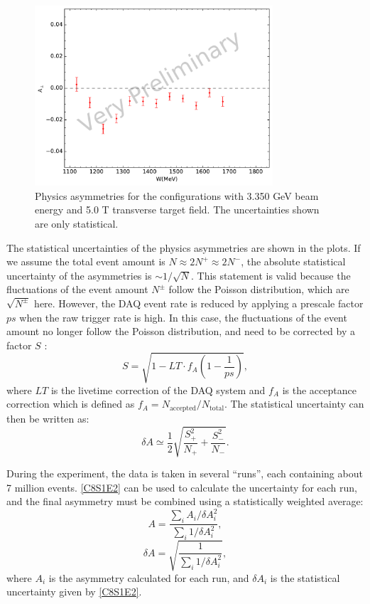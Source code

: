 \begin{figure}[tb!]
  \centering
  \includegraphics[width=0.79\textwidth]{figs/asymmetry-33505090.pdf}
  \caption[Physics asymmetries with $E=3.350$ GeV and $B=5.0$ T.]{Physics asymmetries for the configurations with 3.350 GeV beam energy and 5.0 T transverse target field. The uncertainties shown are only statistical. \label{C8S1F4}}
\end{figure}

The statistical uncertainties of the physics asymmetries are shown in the plots. If we assume the total event amount is $N\approx2N^+\approx2N^-$, the absolute statistical uncertainty of the asymmetries is $\sim1/\sqrt{N}$. This statement is valid because the fluctuations of the event amount $N^{\pm}$ follow the Poisson distribution, which are $\sqrt{N^{\pm}}$ here. However, the DAQ event rate is reduced by applying a prescale factor $ps$ when the raw trigger rate is high. In this case, the fluctuations of the event amount no longer follow the Poisson distribution, and need to be corrected by a factor $S$ \cite{Qiang2007}:
\begin{equation} \label{C8S1E1}
S = \sqrt{1-LT\cdot f_A(1-\frac{1}{ps})},
\end{equation}
where $LT$ is the livetime correction of the DAQ system and $f_A$ is the acceptance correction which is defined as $f_A=N_{\mathrm{accepted}}/N_{\mathrm{total}}$. The statistical uncertainty can then be written as:
\begin{equation} \label{C8S1E2}
\delta A \simeq \frac{1}{2}\sqrt{\frac{S_+^2}{N_+}+\frac{S_-^2}{N_-}}.
\end{equation}

During the experiment, the data is taken in several ``runs'', each containing about 7 million events. \cref{C8S1E2} can be used to calculate the uncertainty for each run, and the final asymmetry must be combined using a statistically weighted average:
\begin{equation} \label{C8S1E3}
A = \frac{\sum_iA_i/\delta A_i^2}{\sum_i1/\delta A_i^2},
\end{equation}
\begin{equation} \label{C8S1E4}
\delta A = \sqrt{\frac{1}{\sum_i1/\delta A_i^2}},
\end{equation}
where $A_i$ is the asymmetry calculated for each run, and $\delta A_i$ is the statistical uncertainty given by \cref{C8S1E2}.

